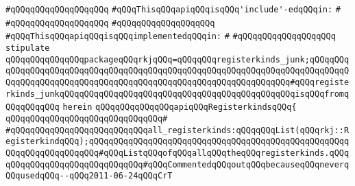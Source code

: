 \verb|#qQQqqQQqqQQqqQQqqQQq|\newline
\newline
\newline
\newline
\newline
\verb|#qQQqThisqQQqapiqQQqisqQQq'include'-edqQQqin:|\newline
\verb|#|\newline
\verb|#qQQqqQQqqQQqqQQqqQQq|\newline
\verb|#qQQqqQQqqQQqqQQqqQQq|\newline
\newline
\verb|#qQQqThisqQQqapiqQQqisqQQqimplementedqQQqin:|\newline
\verb|#|\newline
\verb|#qQQqqQQqqQQqqQQqqQQq|\newline
\newline
\verb|stipulate|\newline
\verb|qQQqqQQqqQQqqQQqpackageqQQqrkjqQQq=qQQqqQQqregisterkinds_junk;qQQqqQQqqQQqqQQqqQQqqQQqqQQqqQQqqQQqqQQqqQQqqQQqqQQqqQQqqQQqqQQqqQQqqQQqqQQqqQQqqQQqqQQqqQQqqQQqqQQqqQQqqQQqqQQqqQQqqQQqqQQqqQQqqQQqqQQq#qQQqregisterkinds_junkqQQqqQQqqQQqqQQqqQQqqQQqqQQqqQQqqQQqqQQqqQQqqQQqisqQQqfromqQQqqQQqqQQq|\newline
\verb|herein|\newline
\newline
\verb|qQQqqQQqqQQqqQQqapiqQQqRegisterkindsqQQq{|\newline
\verb|qQQqqQQqqQQqqQQqqQQqqQQqqQQqqQQq#|\newline
\verb|#qQQqqQQqqQQqqQQqqQQqqQQqqQQqall_registerkinds:qQQqqQQqList(qQQqrkj::RegisterkindqQQq);qQQqqQQqqQQqqQQqqQQqqQQqqQQqqQQqqQQqqQQqqQQqqQQqqQQqqQQqqQQqqQQqqQQqqQQq#qQQqListqQQqofqQQqallqQQqtheqQQqregisterkinds.qQQqqQQqqQQqqQQqqQQqqQQqqQQqqQQq#qQQqCommentedqQQqoutqQQqbecauseqQQqneverqQQqusedqQQq--qQQq2011-06-24qQQqCrT|\newline
